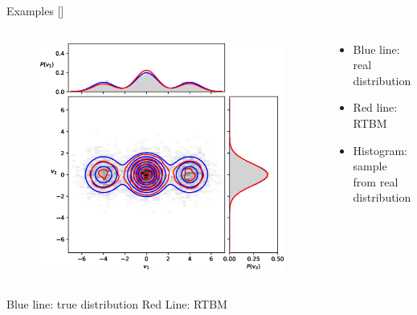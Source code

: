 \documentclass[10pt]{beamer}
\begin{document}
\begin{frame}{Examples \hfill \small [\cite{2020}]}
\begin{columns}
\begin{column}[]{0.7 \textwidth}
\begin{figure}
                \includegraphics[scale=0.30]{figures/ThreeGaussians2d.eps} 
            \end{figure}
        \end{column}
        \begin{column}{0.3 \textwidth}
            \begin{itemize}
                \item Blue line: real distribution
                \item Red line: RTBM
                \item Histogram: sample from real distribution
            \end{itemize}
            
        \end{column}
      \end{columns}

       


Blue line: true distribution
Red Line: RTBM 
\end{frame}
\end{document}
